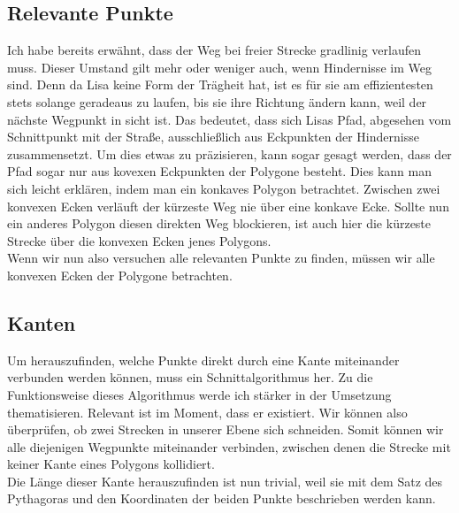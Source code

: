 \documentclass[a4paper,10pt,ngerman]{scrartcl}
\begin{document}
\subsection{Relevante Punkte}
Ich habe bereits erwähnt, dass der Weg bei freier Strecke gradlinig verlaufen muss. Dieser Umstand gilt mehr oder weniger auch, wenn Hindernisse im Weg sind. Denn da Lisa keine Form der Trägheit hat, ist es für sie am effizientesten stets solange geradeaus zu laufen, bis sie ihre Richtung ändern kann, weil der nächste Wegpunkt in sicht ist. Das bedeutet, dass sich Lisas Pfad, abgesehen vom Schnittpunkt mit der Stra\ss e, ausschlie\ss lich aus Eckpunkten der Hindernisse zusammensetzt. Um dies etwas zu präzisieren, kann sogar gesagt werden, dass der Pfad sogar nur aus kovexen Eckpunkten der Polygone besteht. Dies kann man sich leicht erklären, indem man ein konkaves Polygon betrachtet. Zwischen zwei konvexen Ecken verläuft der kürzeste Weg nie über eine konkave Ecke. Sollte nun ein anderes Polygon diesen direkten Weg blockieren, ist auch hier die kürzeste Strecke über die konvexen Ecken jenes Polygons.\\
Wenn wir nun also versuchen alle relevanten Punkte zu finden, müssen wir alle konvexen Ecken der Polygone betrachten.
\subsection{Kanten}
Um herauszufinden, welche Punkte direkt durch eine Kante miteinander verbunden werden können, muss ein Schnittalgorithmus her. Zu die Funktionsweise dieses Algorithmus werde ich stärker in der Umsetzung thematisieren. Relevant ist im Moment, dass er existiert. Wir können also überprüfen, ob zwei Strecken in unserer Ebene sich schneiden. Somit können wir alle diejenigen Wegpunkte miteinander verbinden, zwischen denen die Strecke mit keiner Kante eines Polygons kollidiert.\\
Die Länge dieser Kante herauszufinden ist nun trivial, weil sie mit dem Satz des Pythagoras und den Koordinaten der beiden Punkte beschrieben werden kann.
\end{document}
